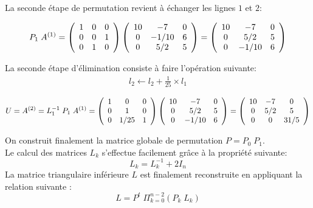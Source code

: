 \documentclass[a4paper, 10pt]{article}
\begin{document}
La seconde étape de permutation revient à échanger les lignes $1$ et $2$:

\begin{equation}
P_1\; A^{(1)}=
 \left(
\begin{array}{c c c}
1  & 0   &  0  \\
0  &  0   & 1  \\
0  &  1  &  0  
\end{array}
\right)
 \left(
\begin{array}{c c c}
10  & -7   &  0  \\
0  &  -1/10   & 6   \\
0  &  5/2  &  5  
\end{array}
\right)
=
 \left(
\begin{array}{c c c}
10  & -7   &  0  \\
0  &  5/2  &  5  \\
0  &  -1/10   & 6   
\end{array}
\right)
\end{equation}

La seconde étape d'élimination consiste à faire l'opération suivante: 
\begin{equation}
 \begin{array}{c}
  l_2 \leftarrow l_2 +\frac{1}{25} \times l_1 
\end{array}
\end{equation}

\begin{equation}
 U=A^{(2)}=L^{-1}_1 \;  P_1 \; A^{(1)}=
  \left(
\begin{array}{c c c}
1  & 0   &  0  \\
0  &  1   & 0  \\
0  &  1/25  &  1  
\end{array}
\right)
 \left(
\begin{array}{c c c}
10  & -7   &  0  \\
0  &  5/2  &  5  \\
0  &  -1/10   & 6   
\end{array}
\right)
=
 \left(
\begin{array}{c c c}
10  & -7   &  0  \\
0  &  5/2   & 5   \\
0  &  0  &  31/5  
\end{array}
\right)
\end{equation}

\noindent On construit finalement la matrice globale de permutation $P=P_0\; P_1$. \\
Le calcul des matrices $L_k$ s'effectue facilement grâce à la propriété suivante:
 \begin{equation}
 L_k=L_k^{-1}+2I_n
 \end{equation}
 La matrice triangulaire inférieure $L$ est finalement reconstruite en appliquant la relation suivante :
  \begin{equation}
 L= P^t\;  \Pi_{k=0}^{n-2}  (P_k \; L_k)
 \end{equation}
\end{document}
